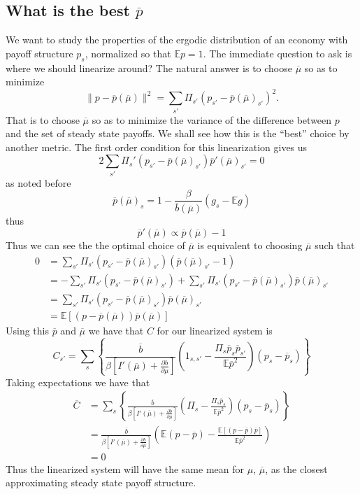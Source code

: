 \documentclass[12pt]{article}
\newcommand{\EE}{\mathbb E}
\newcommand{\barC}{{\overline C}}
\newcommand{\pbar}{{\overline p}}
\newcommand{\bbar}{{\overline b}}
\newcommand{\mubar}{{\overline \mu}}
\begin{document}
\subsection{What is the best $\pbar$}
We want to study the properties of the ergodic distribution of an economy with payoff structure $ p_s$, normalized so that $\EE p = 1$.  The immediate question to ask is where we should linearize around?  The natural answer is to choose $\mubar$ so as to minimize 
\[
\| p-\pbar(\mubar)\|^2 = \sum_{s'}\Pi_{s'}( p_{s'}-\pbar(\mubar)_{s'})^2.
\]That is to choose $\mubar$ so as to minimize the variance of the difference between $ p$ and the set of steady state payoffs.  We shall see how this is the ``best'' choice by another metric.  The first order condition for this linearization gives us 
\[
	2\sum_{s'}\Pi_s'( p_{s'}-\pbar(\mubar)_{s'}) \pbar'(\mubar)_{s'} = 0
\]as noted before 
\[
	\pbar(\mubar)_s =  1 -\frac{\beta}{\bbar(\mubar)}\left(g_s - \EE g\right)
\]thus
\[
	\pbar'(\mubar) \propto \pbar(\mubar)-1
\]Thus we can see the the optimal choice of $\mubar$ is equivalent to choosing $\mubar$ such that 
\begin{equation}
	\begin{split}
		0 &= \sum_{s'}\Pi_{s'}( p_{s'} - \pbar(\mubar)_{s'})(\pbar(\mubar)_{s'}-1)\\
		&= -\sum_{s'}\Pi_{s'}( p_{s'}-\pbar(\mubar)_{s'}) + \sum_{s'}\Pi_{s'}( p_{s'}-\pbar(\mubar)_{s'})\pbar(\mubar)_{s'}\\
		&= \sum_{s'}\Pi_{s'}( p_{s'}-\pbar(\mubar)_{s'})\pbar(\mubar)_{s'}\\
		&=\EE\left[( p-\pbar(\mubar))\pbar(\mubar)\right]
	\end{split}
\end{equation}  Using this $\pbar$ and $\mubar$ we have that $C$ for our linearized system is
\[
	C_{s'} = \sum_s\left\{\frac{\bbar}{\beta\left[I'(\mubar)+\frac{\partial b}{\partial\mu}\right]}\left(1_{s,s'}-\frac{\Pi_s \pbar_s\pbar_{s'}}{\EE\pbar^2}\right)({p}_s-\pbar_s) \right\}
\]Taking expectations we have that 
\begin{equation}
\begin{split}
	\barC &= \sum_s\left\{\frac{\bbar}{\beta\left[I'(\mubar)+\frac{\partial b}{\partial\mu}\right]}\left(\Pi_s - \frac{\Pi_s\pbar_s}{\EE\pbar^2}\right)( p_s-\pbar_s)\right\}\\
	&=\frac{\bbar}{\beta\left[I'(\mubar)+\frac{\partial b}{\partial\mu}\right]}\left(\EE( p-\pbar) -\frac{\EE\left[( p-\pbar)\pbar\right]}{\EE\pbar^2}\right)\\
	&= 0 
\end{split}
\end{equation}  Thus the linearized system will have the same mean for $\mu$, $\mubar$, as the closest approximating steady state payoff structure.
\end{document}
